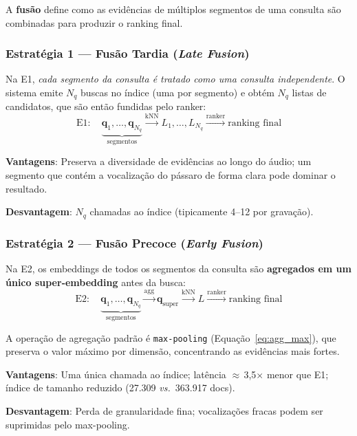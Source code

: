 \documentclass[12pt,a4paper]{article}
\begin{document}
A \textbf{fusão} define como as evidências de múltiplos segmentos de uma consulta
são combinadas para produzir o ranking final.

\subsubsection{Estratégia 1 --- Fusão Tardia (\emph{Late Fusion})}

Na E1, \emph{cada segmento da consulta é tratado como uma consulta independente}.
O sistema emite $N_q$ buscas no índice (uma por segmento) e obtém $N_q$ listas
de candidatos, que são então fundidas pelo ranker:
\begin{equation}
  \text{E1}: \quad
  \underbrace{\mathbf{q}_1, \ldots, \mathbf{q}_{N_q}}_{\text{segmentos}}
  \xrightarrow{\text{kNN}} L_1, \ldots, L_{N_q}
  \xrightarrow{\text{ranker}} \text{ranking final}
  \label{eq:e1}
\end{equation}

\textbf{Vantagens}: Preserva a diversidade de evidências ao longo do áudio; um
segmento que contém a vocalização do pássaro de forma clara pode dominar o
resultado.

\textbf{Desvantagem}: $N_q$ chamadas ao índice (tipicamente 4--12 por gravação).

\subsubsection{Estratégia 2 --- Fusão Precoce (\emph{Early Fusion})}

Na E2, os embeddings de todos os segmentos da consulta são \textbf{agregados em
um único super-embedding} antes da busca:
\begin{equation}
  \text{E2}: \quad
  \underbrace{\mathbf{q}_1, \ldots, \mathbf{q}_{N_q}}_{\text{segmentos}}
  \xrightarrow{\text{agg}} \mathbf{q}_{\text{super}}
  \xrightarrow{\text{kNN}} L
  \xrightarrow{\text{ranker}} \text{ranking final}
  \label{eq:e2}
\end{equation}

A operação de agregação padrão é \texttt{max-pooling} (Equação~\ref{eq:agg_max}),
que preserva o valor máximo por dimensão, concentrando as evidências mais fortes.

\textbf{Vantagens}: Uma única chamada ao índice; latência $\approx$\,3,5$\times$
menor que E1; índice de tamanho reduzido (27.309 \emph{vs.}\ 363.917 docs).

\textbf{Desvantagem}: Perda de granularidade fina; vocalizações fracas podem
ser suprimidas pelo max-pooling.
\end{document}

